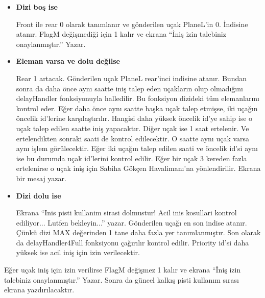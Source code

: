 \documentclass[conference]{IEEEtran}
\begin{document}
\begin{itemize}

\item  \textbf{ Dizi boş ise }

Front ile rear 0 olarak tanımlanır ve gönderilen uçak PlaneL’in 0. İndisine atanır. FlagM değişmediği için 1 kalır ve ekrana “İniş izin talebiniz onaylanmıştır.” Yazar.

\item \textbf{Eleman varsa ve dolu değilse}

Rear 1 artacak. Gönderilen uçak PlaneL rear’inci indisine atanır. Bundan sonra da daha önce aynı saatte iniş talep eden uçakların olup olmadığını delayHandler fonksiyonuyla halledilir. 
Bu fonksiyon dizideki tüm elemanlarını kontrol eder. Eğer daha önce aynı saatte başka uçak talep etmişse, iki uçağın öncelik id’lerine karşılaştırılır. Hangisi daha yüksek öncelik id’ye sahip ise o uçak talep edilen saatte iniş yapacaktır. Diğer uçak ise 1 saat ertelenir. Ve ertelendikten sonraki saati de kontrol edilecektir.  O saatte aynı uçak varsa aynı işlem görülecektir. Eğer iki uçağın talep edilen saati ve öncelik id’si aynı ise bu durumda uçak id’lerini kontrol edilir. Eğer bir uçak 3 kereden fazla ertelenirse o uçak iniş için Sabiha Gökçen Havalimanı’na yönlendirilir. Ekrana bir mesaj yazar.  


\item \textbf{Dizi dolu ise}

Ekrana “Inis pisti kullanim sirasi dolmustur! Acil inis kosullari kontrol ediliyor... Lutfen bekleyin...” yazar. Gönderilen uçağı en son indise atanır. Çünkü dizi MAX değerinden 1 tane daha fazla yer tanımlanmıştır. Son olarak da delayHandler4Full fonksiyonu çağırılır kontrol edilir. Priority id’si daha yüksek ise acil iniş için izin verilecektir. 


\end{itemize}
Eğer uçak iniş için izin verilirse FlagM değişmez 1 kalır ve ekrana “İniş izin talebiniz onaylanmıştır.” Yazar. Sonra da güncel kalkış pisti kullanım sırası ekrana yazdırılacaktır.
\end{document}
